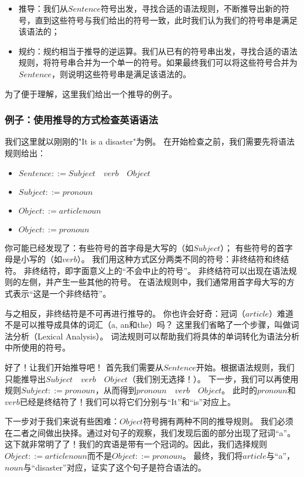 \documentclass[../main.tex]{subfiles}
\begin{document}
  \begin{itemize}
    \item 推导：我们从$Sentence$符号出发，寻找合适的语法规则，不断推导出新的符号，直到这些符号与我们给出的符号一致，此时我们认为我们的符号串是满足该语法的；
    \item 规约：规约相当于推导的逆运算。我们从已有的符号串出发，寻找合适的语法规则，将符号串合并为一个单一的符号。如果最终我们可以将这些符号合并为$Sentence$，则说明这些符号串是满足该语法的。
  \end{itemize}

  \indent 为了便于理解，这里我们给出一个推导的例子。

  \subsubsection*{例子：使用推导的方式检查英语语法}
    \indent 我们这里就以刚刚的"It is a disaster"为例。
    在开始检查之前，我们需要先将语法规则给出：

    \begin{itemize}
      \item $Sentence ::= Subject\quad verb\quad Object$
      \item $Subject ::= pronoun$
      \item $Object ::= article noun$
      \item $Object ::= pronoun$
    \end{itemize}

    \indent 你可能已经发现了：有些符号的首字母是大写的（如$Subject$）；
    有些符号的首字母是小写的（如$verb$）。
    我们用这种方式区分两类不同的符号：非终结符和终结符。
    非终结符，即字面意义上的“不会中止的符号”。
    非终结符可以出现在语法规则的左侧，并产生一些其他的符号。
    在语法规则中，我们通常用首字母大写的方式表示“这是一个非终结符”。

    \indent 与之相反，非终结符是不可再进行推导的。
    你也许会好奇：冠词（$article$）难道不是可以推导成具体的词汇（a, an和the）吗？
    这里我们省略了一个步骤，叫做词法分析（Lexical Analysis）。
    词法规则可以帮助我们将具体的单词转化为语法分析中所使用的符号。

    \indent 好了！让我们开始推导吧！
    首先我们需要从$Sentence$开始。根据语法规则，我们只能推导出$Subject\quad verb\quad Object$（我们别无选择！）。
    下一步，我们可以再使用规则$Subject ::= pronoun$，从而得到$pronoun\quad verb\quad Object$。
    此时的$pronoun$和$verb$已经是终结符了！我们可以将它们分别与“It”和“is”对应上。

    \indent 下一步对于我们来说有些困难：$Object$符号拥有两种不同的推导规则。
    我们必须在二者之间做出抉择。通过对句子的观察，我们发现后面的部分出现了冠词“a”。
    这下就非常明了了！我们的宾语是带有一个冠词的。因此，我们选择规则 $Object ::= article noun$而不是$Object ::= pronoun$。
    最终，我们将$article$与“a”，$noun$与“disaster”对应，证实了这个句子是符合语法的。
\end{document}
